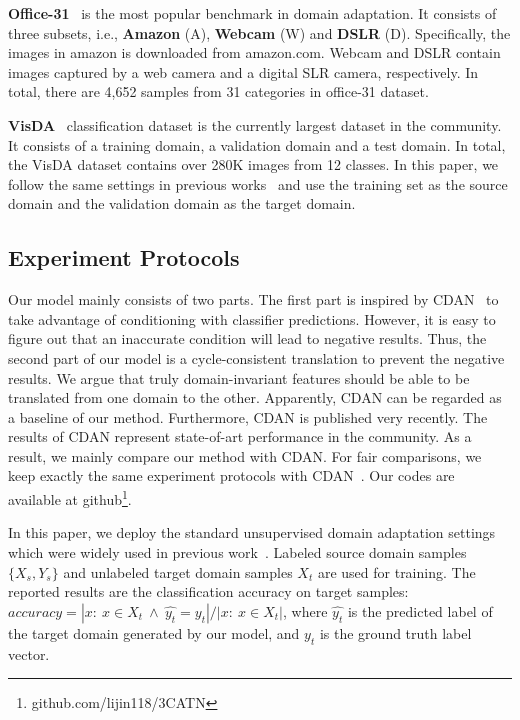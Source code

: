 \documentclass[sigconf]{acmart}
\begin{document}
 {\bf Office-31}~\cite{saenko2010adapting} is the most popular benchmark in domain adaptation. It consists of three subsets, i.e., {\bf Amazon} (A), {\bf Webcam} (W) and {\bf DSLR} (D). Specifically, the images in amazon is downloaded from amazon.com. Webcam and DSLR contain images captured by a web camera and a digital SLR camera, respectively. In total, there are 4,652 samples from 31 categories in office-31 dataset. 



 {\bf VisDA}~\cite{visda2017} classification dataset is the currently largest dataset in the community. It consists of a training domain, a validation domain and a test domain. In total, the VisDA dataset contains over 280K images from 12 classes. In this paper, we follow the same settings in previous works~\cite{saito2018maximum,pinheiro2018unsupervised} and use the training set as the source domain and the validation domain as the target domain. 

 \subsection{Experiment Protocols}
Our model mainly consists of two parts. The first part is inspired by CDAN~\cite{long2018conditional} to take advantage of conditioning with classifier predictions. However, it is easy to figure out that an inaccurate condition will lead to negative results. Thus, the second part of our model is a cycle-consistent translation to prevent the negative results. We argue that truly domain-invariant features should be able to be translated from one domain to the other. Apparently, CDAN can be regarded as a baseline of our method. Furthermore, CDAN is published very recently. The results of CDAN represent state-of-art performance in the community. As a result, we mainly compare our method with CDAN. For fair comparisons, we keep exactly the same experiment protocols with CDAN~\cite{long2018conditional}. Our codes are available at github\footnote{github.com/lijin118/3CATN}.


In this paper, we deploy the standard unsupervised domain adaptation settings which were widely used in previous work~\cite{long2018conditional,gong2012geodesic}. Labeled source domain samples $\{X_s,Y_s\}$ and unlabeled target domain samples $X_t$ are used for training. The reported results are the classification accuracy on target samples:
$\displaystyle accuracy = {{|x:~x \in X_t ~\wedge~ \hat{y_t}=y_t|}/{|x:~ x \in X_t|}}$, where ${\hat{y_t}}$ is the predicted label of the target domain generated by our model, and ${y}_t$ is the ground truth label vector. 
\end{document}
